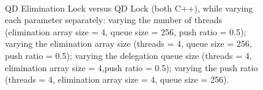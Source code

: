 \begin{figure}[]
\centering
{}
\\
\caption[]{QD Elimination Lock versus QD Lock (both C++), while varying each parameter separately:  varying the number of threads (elimination array size = 4, queue size = 256, push ratio = 0.5);  varying the elimination array size (threads = 4, queue size = 256, push ratio = 0.5);  varying the delegation queue size (threads = 4, elimination array size = 4,push ratio = 0.5);  varying the push ratio (threads = 4, elimination array size = 4, queue size = 256).}
\label{fig:qdlock}
\end{figure}

